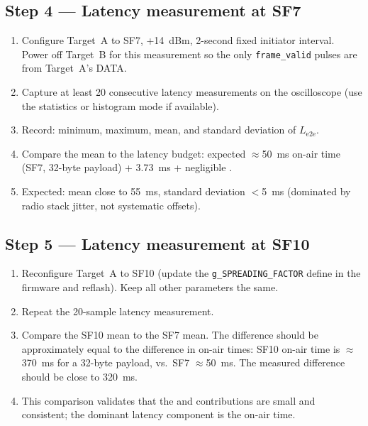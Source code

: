 \documentclass[11pt,letterpaper]{article}
\begin{document}

\subsection{Step 4 --- Latency measurement at SF7}
\begin{enumerate}[leftmargin=2em]
	\item Configure Target~A to SF7, +14~dBm, 2-second fixed initiator interval. Power off Target~B for this measurement so the only \texttt{frame\_valid} pulses are from Target~A's DATA.
	\item Capture at least 20 consecutive latency measurements on the oscilloscope (use the statistics or histogram mode if available).
	\item Record: minimum, maximum, mean, and standard deviation of $L_{\text{e2e}}$.
	\item Compare the mean to the latency budget: expected $\approx$50~ms \RF{} on-air time (SF7, 32-byte payload) + 3.73~ms \UART{} + negligible \FPGA{}.
	\item Expected: mean close to 55~ms, standard deviation $<$5~ms (dominated by radio stack jitter, not systematic offsets).
\end{enumerate}

\subsection{Step 5 --- Latency measurement at SF10}
\begin{enumerate}[leftmargin=2em]
	\item Reconfigure Target~A to SF10 (update the \texttt{g\_SPREADING\_FACTOR} define in the firmware and reflash). Keep all other parameters the same.
	\item Repeat the 20-sample latency measurement.
	\item Compare the SF10 mean to the SF7 mean. The difference should be approximately equal to the difference in \RF{} on-air times: SF10 on-air time is $\approx$370~ms for a 32-byte payload, vs.\ SF7 $\approx$50~ms. The measured difference should be close to 320~ms.
	\item This comparison validates that the \UART{} and \FPGA{} contributions are small and consistent; the dominant latency component is the \RF{} on-air time.
\end{enumerate}
\end{document}
